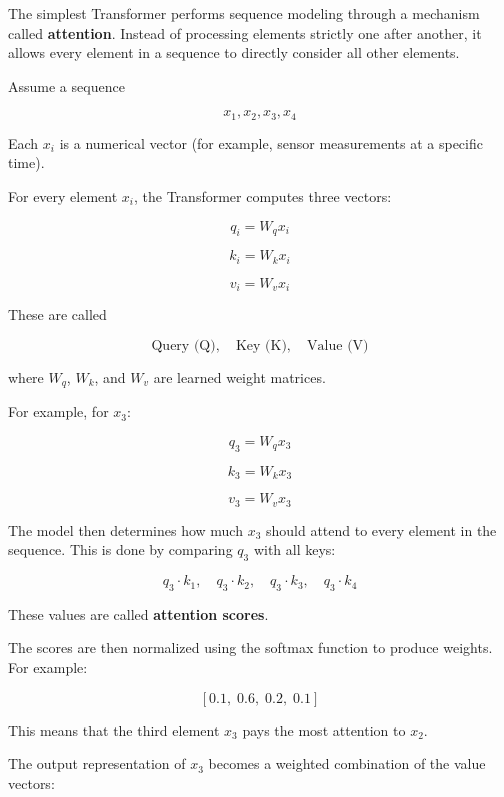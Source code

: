 \documentclass[a4paper]{article}
\title{}
\date{}
\begin{document}
    \maketitle
    The simplest Transformer performs sequence modeling through a mechanism called \textbf{attention}. Instead of processing elements strictly one after another, it allows every element in a sequence to directly consider all other elements.

    Assume a sequence
    
    \[
    x_1, x_2, x_3, x_4
    \]
    
    Each \(x_i\) is a numerical vector (for example, sensor measurements at a specific time).
    
    For every element \(x_i\), the Transformer computes three vectors:
    
    \[
    q_i = W_q x_i
    \]
    
    \[
    k_i = W_k x_i
    \]
    
    \[
    v_i = W_v x_i
    \]
    
    These are called
    
    \[
    \text{Query (Q)}, \quad \text{Key (K)}, \quad \text{Value (V)}
    \]
    
    where \(W_q\), \(W_k\), and \(W_v\) are learned weight matrices.
    
    For example, for \(x_3\):
    
    \[
    q_3 = W_q x_3
    \]
    
    \[
    k_3 = W_k x_3
    \]
    
    \[
    v_3 = W_v x_3
    \]
    
    The model then determines how much \(x_3\) should attend to every element in the sequence. This is done by comparing \(q_3\) with all keys:
    
    \[
    q_3 \cdot k_1,\quad q_3 \cdot k_2,\quad q_3 \cdot k_3,\quad q_3 \cdot k_4
    \]
    
    These values are called \textbf{attention scores}.
    
    The scores are then normalized using the softmax function to produce weights. For example:
    
    \[
    [0.1,\; 0.6,\; 0.2,\; 0.1]
    \]
    
    This means that the third element \(x_3\) pays the most attention to \(x_2\).
    
    The output representation of \(x_3\) becomes a weighted combination of the value vectors:
    
\end{document}
